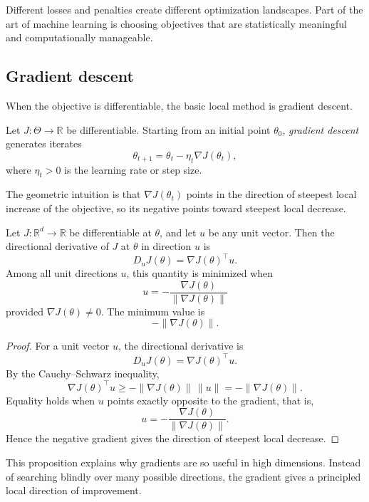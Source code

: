 Different losses and penalties create different optimization landscapes. Part of the art of machine learning is choosing objectives that are statistically meaningful and computationally manageable.

\subsection*{Gradient descent}

When the objective is differentiable, the basic local method is gradient descent.

\begin{definition}
Let $J:\Theta\to\mathbb R$ be differentiable. Starting from an initial point $\theta_0$, \emph{gradient descent} generates iterates
\[
\theta_{t+1}=\theta_t-\eta_t \nabla J(\theta_t),
\]
where $\eta_t>0$ is the learning rate or step size.
\end{definition}

The geometric intuition is that $\nabla J(\theta_t)$ points in the direction of steepest local increase of the objective, so its negative points toward steepest local decrease.

\begin{proposition}
Let $J:\mathbb R^d\to\mathbb R$ be differentiable at $\theta$, and let $u$ be any unit vector. Then the directional derivative of $J$ at $\theta$ in direction $u$ is
\[
D_u J(\theta)=\nabla J(\theta)^\top u.
\]
Among all unit directions $u$, this quantity is minimized when
\[
u=-\frac{\nabla J(\theta)}{\|\nabla J(\theta)\|}
\]
provided $\nabla J(\theta)\neq 0$. The minimum value is
\[
-\|\nabla J(\theta)\|.
\]
\end{proposition}

\begin{proof}
For a unit vector $u$, the directional derivative is
\[
D_u J(\theta)=\nabla J(\theta)^\top u.
\]
By the Cauchy--Schwarz inequality,
\[
\nabla J(\theta)^\top u \ge -\|\nabla J(\theta)\|\,\|u\|=-\|\nabla J(\theta)\|.
\]
Equality holds when $u$ points exactly opposite to the gradient, that is,
\[
u=-\frac{\nabla J(\theta)}{\|\nabla J(\theta)\|}.
\]
Hence the negative gradient gives the direction of steepest local decrease.
\end{proof}

This proposition explains why gradients are so useful in high dimensions. Instead of searching blindly over many possible directions, the gradient gives a principled local direction of improvement.

